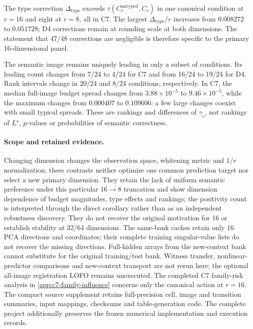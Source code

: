 The type correction $\Delta_{\mathrm{type}}$ exceeds $\tau(C_r^{\mathrm{untyped}},C_r)$ in one canonical condition at $r=16$ and eight at $r=8$, all in C7. The largest $\Delta_{\mathrm{type}}/r$ increases from $0.008272$ to $0.051728$; D4 corrections remain at rounding scale at both dimensions. The statement that 47/48 corrections are negligible is therefore specific to the primary 16-dimensional panel.

The semantic image remains uniquely leading in only a subset of conditions. Its leading count changes from 7/24 to 4/24 for C7 and from 16/24 to 19/24 for D4. Rank intervals change in 20/24 and 8/24 conditions, respectively. In C7, the median full-image budget spread changes from $3.88\times10^{-5}$ to $9.46\times10^{-5}$, while the maximum changes from $0.000407$ to $0.109606$: a few large changes coexist with small typical spreads. These are rankings and differences of $\gamma_r$, not rankings of $L^\star$, $p$-values or probabilities of semantic correctness.

\paragraph{Scope and retained evidence.}
Changing dimension changes the observation space, whitening metric and $1/r$ normalization; these contrasts neither optimize one common prediction target nor select a new primary dimension. They retain the lack of uniform semantic preference under this particular $16\!\to\!8$ truncation and show dimension dependence of budget magnitudes, type effects and rankings; the positivity count is interpreted through the direct corollary rather than as an independent robustness discovery. They do not recover the original motivation for 16 or establish stability at 32/64 dimensions. The same-bank caches retain only 16 PCA directions and coordinates; their complete training singular-value lists do not recover the missing directions. Full-hidden arrays from the new-context bank cannot substitute for the original training/test bank. Witness transfer, nonlinear-predictor comparisons and new-context transport are not rerun here; the optional all-image registration LOFO remains unexecuted. The completed C7 family-risk analysis in \cref{app:c7-family-influence} concerns only the canonical action at $r=16$. The compact source supplement retains full-precision cell, image and transition summaries, input mappings, checksums and table-generation code. The complete project additionally preserves the frozen numerical implementation and execution records.
